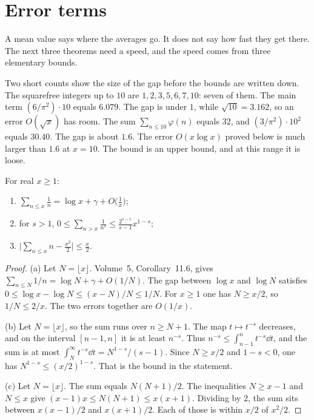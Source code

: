 \section{Error terms}

A mean value says where the averages go. It does not say how fast they get there. The next three theorems need a speed, and the speed comes from three elementary bounds.

Two short counts show the size of the gap before the bounds are written down. The squarefree integers up to $10$ are $1,2,3,5,6,7,10$: seven of them. The main term $(6/\pi^2)\cdot10$ equals $6.079$. The gap is under $1$, while $\sqrt{10}=3.162$, so an error $O(\sqrt x)$ has room. The sum $\sum_{n\le10}\varphi(n)$ equals $32$, and $(3/\pi^2)\cdot10^2$ equals $30.40$. The gap is about $1.6$. The error $O(x\log x)$ proved below is much larger than $1.6$ at $x=10$. The bound is an upper bound, and at this range it is loose.

\begin{lemma}\label{lem:elemsums}
For real $x\ge1$:
\begin{enumerate}[label=(\alph*)]
\item $\sum_{n\le x}\frac1n=\log x+\gamma+O\bigl(\frac1x\bigr)$;
\item for $s>1$, $0\le\sum_{n>x}\frac1{n^s}\le\frac{2^{s-1}}{s-1}x^{1-s}$;
\item $\bigl|\sum_{n\le x}n-\frac{x^2}2\bigr|\le\frac x2$.
\end{enumerate}
\end{lemma}
\begin{proof}
(a) Let $N=\lfloor x\rfloor$. Volume~5, Corollary~11.6, gives $\sum_{n\le N}1/n=\log N+\gamma+O(1/N)$. The gap between $\log x$ and $\log N$ satisfies $0\le\log x-\log N\le(x-N)/N\le1/N$. For $x\ge1$ one has $N\ge x/2$, so $1/N\le2/x$. The two errors together are $O(1/x)$.

(b) Let $N=\lfloor x\rfloor$, so the sum runs over $n\ge N+1$. The map $t\mapsto t^{-s}$ decreases, and on the interval $[n-1,n]$ it is at least $n^{-s}$. Thus $n^{-s}\le\int_{n-1}^n t^{-s}\dd t$, and the sum is at most $\int_N^\infty t^{-s}\dd t=N^{1-s}/(s-1)$. Since $N\ge x/2$ and $1-s<0$, one has $N^{1-s}\le(x/2)^{1-s}$. That is the bound in the statement.

(c) Let $N=\lfloor x\rfloor$. The sum equals $N(N+1)/2$. The inequalities $N\ge x-1$ and $N\le x$ give $(x-1)x\le N(N+1)\le x(x+1)$. Dividing by $2$, the sum sits between $x(x-1)/2$ and $x(x+1)/2$. Each of those is within $x/2$ of $x^2/2$.
\end{proof}

